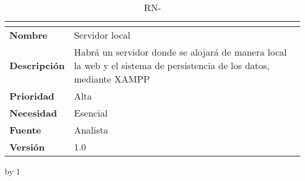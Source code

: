 \begin{table}[H]
	\caption{RN-\number\rn}
	\begin{tabular}{|l|p{}|}
		\hline
		\multicolumn{2}{|c|}{\cellcolor[HTML]{BFBFBF}{\color[HTML]{000000} \textbf{RN-\number\rn}}} \\ \hline
		\textbf{Nombre}      & Servidor local                                                                                                     \\ \hline
		\textbf{Descripción} & Habrá un servidor donde se alojará de manera local la web y el sistema de persistencia de los datos, mediante XAMPP \\ \hline
		\textbf{Prioridad}   & Alta                                                                                                               \\ \hline
		\textbf{Necesidad}   & Esencial                                                                                                           \\ \hline
		\textbf{Fuente}      & Analista                                                                                                           \\ \hline
		\textbf{Versión}     & 1.0                                                                                                                \\ \hline
	\end{tabular}
\end{table}
\advance\rn by 1
